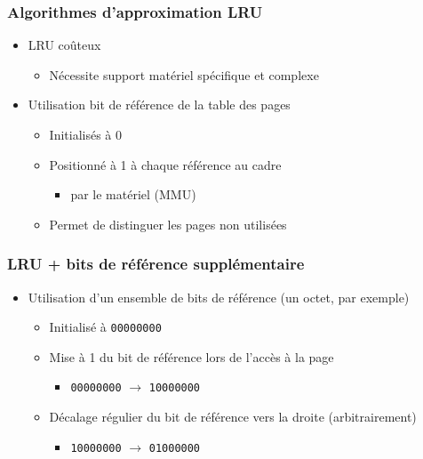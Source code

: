 \begin{frame}
\frametitle{Algorithmes d'approximation LRU}
\begin{itemize}
\item LRU coûteux
\begin{itemize}
\item Nécessite support matériel spécifique et complexe
\end{itemize}
\item Utilisation bit de référence de la table des pages
\begin{itemize}
\item Initialisés à 0
\item Positionné à 1 à chaque référence au cadre
\begin{itemize}
\item par le matériel (MMU)
\end{itemize}
\item Permet de distinguer les pages non utilisées
\end{itemize}
\end{itemize}
\end{frame}


\begin{frame}
\frametitle{LRU + bits de référence supplémentaire}
\begin{itemize}
\item Utilisation d'un ensemble de bits de référence (un octet, par exemple)
\begin{itemize}
\item Initialisé à \texttt{00000000}
\item Mise à 1 du bit de référence lors de l'accès à la page
\begin{itemize}
\item \texttt{00000000} $\rightarrow$ \texttt{10000000}
\end{itemize}
\item Décalage régulier du bit de référence vers la droite (arbitrairement)
\begin{itemize}
\item \texttt{10000000} $\rightarrow$ \texttt{01000000}
\end{itemize}
\end{itemize}
\end{itemize}

\end{frame}


